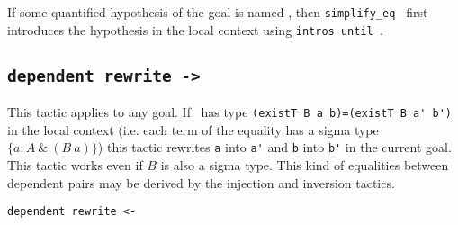 \begin{coq_example*}
\Rem If some quantified hypothesis of the goal is named {\ident}, then
{\tt simplify\_eq {\ident}} first introduces the hypothesis in the local
context using \texttt{intros until \ident}.


\subsection{\tt dependent rewrite -> \ident}
\label{dependent-rewrite}

This tactic applies to any goal.  If \ident\ has type
\verb+(existT B a b)=(existT B a' b')+
in the local context (i.e. each term of the
equality has a sigma type $\{ a:A~ \&~(B~a)\}$) this tactic rewrites
\verb+a+ into \verb+a'+ and \verb+b+ into \verb+b'+ in the current
goal. This tactic works even if $B$ is also a sigma type.  This kind
of equalities between dependent pairs may be derived by the injection
and inversion tactics.

\begin{Variants}
\item{\tt dependent rewrite <- {\ident}}


\end{Variants}
\end{coq_example*}
